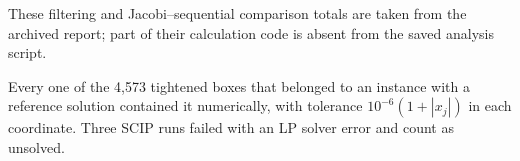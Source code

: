 These filtering and Jacobi--sequential comparison totals are taken from
the archived report; part of their calculation code is absent from the
saved analysis script.

Every one of the 4,573 tightened boxes that belonged to an instance with a
reference solution contained it numerically, with tolerance $10^{-6}(1+|x_j|)$
in each coordinate. Three SCIP runs failed with an LP solver error and count as unsolved.
